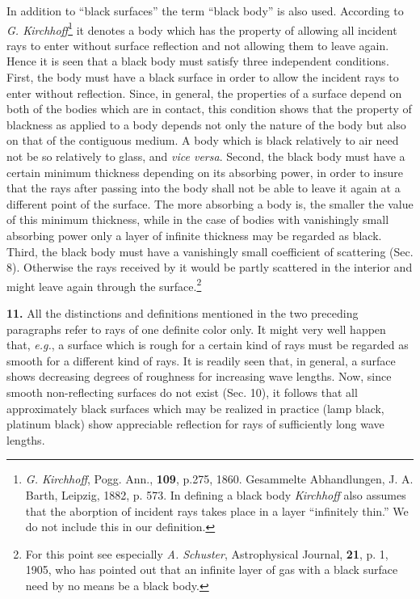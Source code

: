 \documentclass[12pt,oneside]{book}
\begin{document}
In addition to ``black surfaces'' the term ``black body'' is also used. According to \textit{G. Kirchhoff}\footnote{\textit{G. Kirchhoff}, Pogg. Ann., \textbf{109}, p.275, 1860. Gesammelte Abhandlungen, J. A. Barth, Leipzig, 1882, p. 573. In defining a black body \textit{Kirchhoff} also assumes that the aborption of incident rays takes place in a layer ``infinitely thin.'' We do not include this in our definition.} it denotes a body which has the property of allowing all incident rays to enter without surface reflection and not allowing them to leave again. Hence it is seen that a black body must satisfy three independent conditions. First, the body must have a black surface in order to allow the incident rays to enter without reflection. Since, in general, the properties of a surface depend on both of the bodies which are in contact, this condition shows that the property of blackness as applied to a body depends not only the nature of the body but also on that of the contiguous medium. A body which is black relatively to air need not be so relatively to glass, and \textit{vice versa}. Second, the black body must have a certain minimum thickness depending on its absorbing power, in order to insure that the rays after passing into the body shall not be able to leave it again at a different point of the surface. The more absorbing a body is, the smaller the value of this minimum thickness, while in the case of bodies with vanishingly small absorbing power only a layer of infinite thickness may be regarded as black. Third, the black body must have a vanishingly small coefficient of scattering (Sec. 8). Otherwise the rays received by it would be partly scattered in the interior and might leave again through the surface.\footnote{For this point see especially \textit{A. Schuster}, Astrophysical Journal, \textbf{21}, p. 1, 1905, who has pointed out that an infinite layer of gas with a black surface need by no means be a black body.} \par 

\textbf{11.} All the distinctions and definitions mentioned in the two preceding paragraphs refer to rays of one definite color only. It might very well happen that, \textit{e.g.}, a surface which is rough for a certain kind of rays must be regarded as smooth for a different kind of rays. It is readily seen that, in general, a surface shows decreasing degrees of roughness for increasing wave lengths. Now, since smooth non-reflecting surfaces do not exist (Sec. 10), it follows that all approximately black surfaces which may be realized in practice (lamp black, platinum black) show appreciable reflection for rays of sufficiently long wave lengths. \par 
\end{document}
